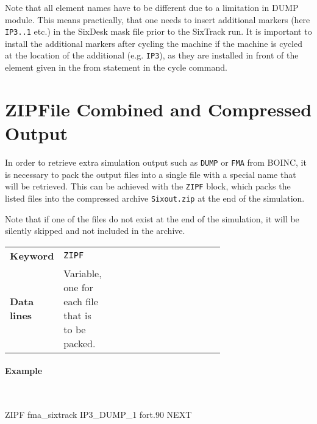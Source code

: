Note that all element names have to be different due to a limitation in DUMP module. This means practically, that one needs to insert additional markers (here \texttt{IP3..1} etc.) in the SixDesk \cite{sixdesk1,sixdesk2} mask file prior to the SixTrack run. It is important to install the additional markers after cycling the machine if the machine is cycled at the location of the additional (e.g. \texttt{IP3}), as they are installed in front of the element given in the from statement in the cycle command.

\section{ZIPFile Combined and Compressed Output} \label{sec:ZIPF}

In order to retrieve extra simulation output such as \texttt{DUMP} or \texttt{FMA} from BOINC, it is necessary to pack the output files into a single file with a special name that will be retrieved.
This can be achieved with the \texttt{ZIPF} block, which packs the listed files into the compressed archive \texttt{Sixout.zip} at the end of the simulation.

Note that if one of the files do not exist at the end of the simulation, it will be silently skipped and not included in the archive.

\bigskip
\begin{tabular}{@{}llp{0.7\linewidth}}
    \textbf{Keyword}    & \texttt{ZIPF} \\
    \textbf{Data lines} & Variable, one for each file that is to be packed. \\
\end{tabular}

\paragraph{Example}~
\begin{cverbatim}
ZIPF
fma_sixtrack
IP3_DUMP_1
fort.90
NEXT
\end{cverbatim}

